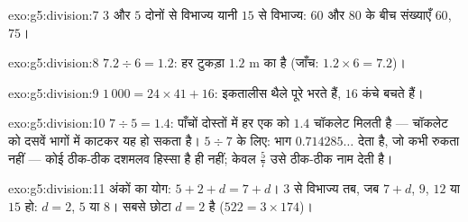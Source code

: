\begin{solution}{exo:g5:division:7}
$3$ और $5$ दोनों से विभाज्य यानी $15$ से विभाज्य: $60$ और $80$
के बीच संख्याएँ $60$, $75$।
\end{solution}

\begin{solution}{exo:g5:division:8}
$7.2 \div 6 = 1.2$: हर टुकड़ा $1.2$ m का है (जाँच:
$1.2 \times 6 = 7.2$)।
\end{solution}

\begin{solution}{exo:g5:division:9}
$1\,000 = 24 \times 41 + 16$: इकतालीस थैले पूरे भरते हैं, $16$
कंचे बचते हैं।
\end{solution}

\begin{solution}{exo:g5:division:10}
$7 \div 5 = 1.4$: पाँचों दोस्तों में हर एक को $1.4$ चॉकलेट
मिलती है --- चॉकलेट को दसवें भागों में काटकर यह हो सकता है।
$5 \div 7$ के लिए: भाग $0.714285\dots$ देता है, जो कभी रुकता
नहीं --- कोई ठीक-ठीक दशमलव हिस्सा है ही नहीं; केवल 
$\frac57$ उसे ठीक-ठीक नाम देती है।
\end{solution}

\begin{solution}{exo:g5:division:11}
अंकों का योग: $5 + 2 + d = 7 + d$। $3$ से विभाज्य तब, जब
$7 + d$, $9$, $12$ या $15$ हो: $d = 2$, $5$ या $8$। सबसे छोटा
$d = 2$ है ($522 = 3 \times 174$)।
\end{solution}
